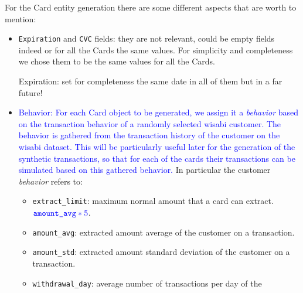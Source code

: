 \documentclass{article}
\begin{document}
For the Card entity generation there are some different aspects that are worth to mention:
\begin{itemize}

    \item \texttt{Expiration} and \texttt{CVC} fields: they are not relevant, could be empty 
    fields indeed or for all the Cards the same values. For simplicity and completeness we 
    chose them to be the same values for all the Cards.
    \begin{tcolorbox}
      Expiration: set for completeness the same date in all of them but in a far future!
    \end{tcolorbox}
    \item \textcolor{blue}{Behavior: For each Card object to be generated, we assign it a 
    \textit{behavior} based on the transaction behavior of a randomly selected wisabi 
    customer. The behavior is gathered from the transaction history of the customer on 
    the wisabi dataset. This will be particularly useful later for the generation of the 
    synthetic transactions, so that for each of the cards their transactions can be 
    simulated based on this gathered behavior.}
    In particular the customer \textit{behavior} refers to: 
    \begin{itemize}
        \item \texttt{extract\_limit}: maximum normal amount that a card can extract. 
        $\textcolor{blue}{\texttt{amount\_avg} * 5}$.
        \item \texttt{amount\_avg}: extracted amount average of the customer on a transaction.
        \item \texttt{amount\_std}: extracted amount standard deviation of the customer 
        on a transaction.
        \item \texttt{withdrawal\_day}: average number of transactions per day of the 

\end{itemize}
\end{itemize}
\end{document}
